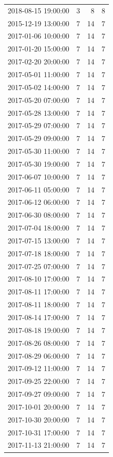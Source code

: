\begin{tabular}{lrrr}
2018-08-15 19:00:00 & 3 & 8 & 8 \\
2015-12-19 13:00:00 & 7 & 14 & 7 \\
2017-01-06 10:00:00 & 7 & 14 & 7 \\
2017-01-20 15:00:00 & 7 & 14 & 7 \\
2017-02-20 20:00:00 & 7 & 14 & 7 \\
2017-05-01 11:00:00 & 7 & 14 & 7 \\
2017-05-02 14:00:00 & 7 & 14 & 7 \\
2017-05-20 07:00:00 & 7 & 14 & 7 \\
2017-05-28 13:00:00 & 7 & 14 & 7 \\
2017-05-29 07:00:00 & 7 & 14 & 7 \\
2017-05-29 09:00:00 & 7 & 14 & 7 \\
2017-05-30 11:00:00 & 7 & 14 & 7 \\
2017-05-30 19:00:00 & 7 & 14 & 7 \\
2017-06-07 10:00:00 & 7 & 14 & 7 \\
2017-06-11 05:00:00 & 7 & 14 & 7 \\
2017-06-12 06:00:00 & 7 & 14 & 7 \\
2017-06-30 08:00:00 & 7 & 14 & 7 \\
2017-07-04 18:00:00 & 7 & 14 & 7 \\
2017-07-15 13:00:00 & 7 & 14 & 7 \\
2017-07-18 18:00:00 & 7 & 14 & 7 \\
2017-07-25 07:00:00 & 7 & 14 & 7 \\
2017-08-10 17:00:00 & 7 & 14 & 7 \\
2017-08-11 17:00:00 & 7 & 14 & 7 \\
2017-08-11 18:00:00 & 7 & 14 & 7 \\
2017-08-14 17:00:00 & 7 & 14 & 7 \\
2017-08-18 19:00:00 & 7 & 14 & 7 \\
2017-08-26 08:00:00 & 7 & 14 & 7 \\
2017-08-29 06:00:00 & 7 & 14 & 7 \\
2017-09-12 11:00:00 & 7 & 14 & 7 \\
2017-09-25 22:00:00 & 7 & 14 & 7 \\
2017-09-27 09:00:00 & 7 & 14 & 7 \\
2017-10-01 20:00:00 & 7 & 14 & 7 \\
2017-10-30 20:00:00 & 7 & 14 & 7 \\
2017-10-31 17:00:00 & 7 & 14 & 7 \\
2017-11-13 21:00:00 & 7 & 14 & 7 \\

\end{tabular}
